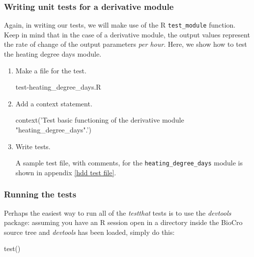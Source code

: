 \documentclass{article}\usepackage[]{graphicx}\usepackage[]{color}
\newcommand{\Rcode}[1]{\lstinline[style=Rstyle]{#1}}
\begin{document}
\subsubsection{Writing unit tests for a derivative module}
\label{sec:write_deriv_unit_test}

  Again, in writing our tests, we will make use of the R
  \Rcode{test_module} function. Keep in mind that in the case of a
  derivative module, the output values represent the rate of change of
  the output parameters \emph{per hour}. Here, we show how to test the
  heating degree days module.

\begin{enumerate}

\item Make a file for the test.

  \begin{Rexample}[4]
    test-heating_degree_days.R
  \end{Rexample}

\item Add a context statement.

  \begin{Rexample}[4]
    context('Test basic functioning of the derivative module "heating_degree_days".')
  \end{Rexample}

\item Write tests.

  A sample test file, with comments, for the
  \Rcode{heating_degree_days} module is shown in appendix \ref{hdd
    test file}.

\end{enumerate}

\subsubsection{Running the tests}

Perhaps the easiest way to run all of the \emph{testthat} tests is to
use the \emph{devtools} package: assuming you have an R session open
in a directory inside the BioCro source tree and \emph{devtools} has
been loaded, simply do this:

\begin{Rlisting}[2]
  test()
\end{Rlisting}
\end{document}
